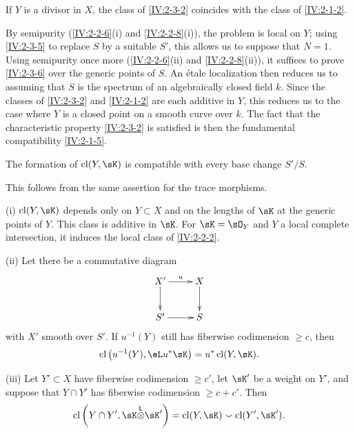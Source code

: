 \begin{lemma}\label{IV:2-3-6}
If $Y$ is a divisor in $X$, the class of \ref{IV:2-3-2} coincides with the
class of \ref{IV:2-1-2}.
\end{lemma}

By semipurity (\ref{IV:2-2-6}(i) and \ref{IV:2-2-8}(i)), the problem is local
on $Y$; using \ref{IV:2-3-5} to replace $S$ by a suitable $S'$, this allows
us to suppose that $N=1$. Using semipurity once more
(\ref{IV:2-2-6}(ii) and \ref{IV:2-2-8}(ii)), it suffices to prove
\ref{IV:2-3-6} over the generic points of $S$. An étale localization then
reduces us to assuming that $S$ is the spectrum of an algebraically closed
field $k$. Since the classes of \ref{IV:2-3-2} and \ref{IV:2-1-2} are each
additive in $Y$, this reduces us to the case where $Y$ is a closed point on a
smooth curve over $k$. The fact that the characteristic property
\ref{IV:2-3-2} is satisfied is then the fundamental compatibility
\ref{IV:2-1-5}.






\begin{lemma}\label{IV:2-3-7}
The formation of $\cl(Y,\sK)$ is compatible with every base change $S'/S$.
\end{lemma}

This follows from the same assertion for the trace morphisms.






\begin{theorem}\label{IV:2-3-8}
(i) $\cl(Y,\sK)$ depends only on $Y\subset X$ and on the lengths of $\sK$ at
the generic points of $Y$. This class is additive in $\sK$. For
$\sK=\sO_Y$ and $Y$ a local complete intersection, it induces the local
class of \ref{IV:2-2-2}.

(ii) Let there be a commutative diagram
\[\xymatrix{
  X' \ar[r]^-u \ar[d]
    & X \ar[d] \\
  S' \ar[r]
    & S
}\]
with $X'$ smooth over $S'$. If $u^{-1}(Y)$ still has fiberwise codimension
$\geqslant c$, then
\[
  \cl\left(u^{-1}(Y),\eL u^\ast\sK\right) = u^\ast \cl(Y,\sK) \text{.}
\]

(iii) Let $Y'\subset X$ have fiberwise codimension $\geqslant c'$, let
$\sK'$ be a weight on $Y'$, and suppose that $Y\cap Y'$ has fiberwise
codimension $\geqslant c+c'$. Then
\[
\cl\left(Y\cap Y',\sK\lotimes \sK'\right) = \cl(Y,\sK) \smallsmile \cl(Y',\sK') \text{.}
\]
\end{theorem}




